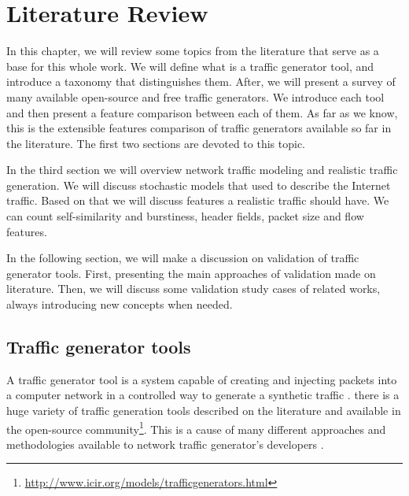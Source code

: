\chapter{Literature Review}\label{ch:literature-review}

In this chapter, we will review some topics from the literature that serve as a base for this whole work. We will define what is a traffic generator tool, and introduce a taxonomy that distinguishes them. After, we will present a survey of many available open-source and free traffic generators. We introduce each tool and then present a feature comparison between each of them. As far as we know, this is the extensible features comparison of traffic generators available so far in the literature. The first two sections are devoted to this topic.

In the third section we will overview network traffic modeling and realistic traffic generation. We will discuss stochastic models that used to describe the Internet traffic. Based on that we will discuss features a realistic traffic should have.  We can count self-similarity and burstiness,  header fields, packet size and flow features.

In the following section, we will make a discussion on validation of traffic generator tools. First, presenting the main approaches of validation made on literature. Then, we will discuss some validation study cases of related works, always introducing new concepts when needed.


\section{Traffic generator tools}

A traffic generator tool is a system capable of creating and injecting packets into a computer network in a controlled way to generate a synthetic traffic \cite{validate-trafficgen}.  there is a huge variety of traffic generation tools described on the literature \cite{validate-trafficgen} \cite{ditg-paper} and available in the open-source community\footnote{\href{http://www.icir.org/models/trafficgenerators.html}{http://www.icir.org/models/trafficgenerators.html}}. This is a cause of many  different approaches and methodologies available to network traffic generator's developers \cite{validate-trafficgen}.

